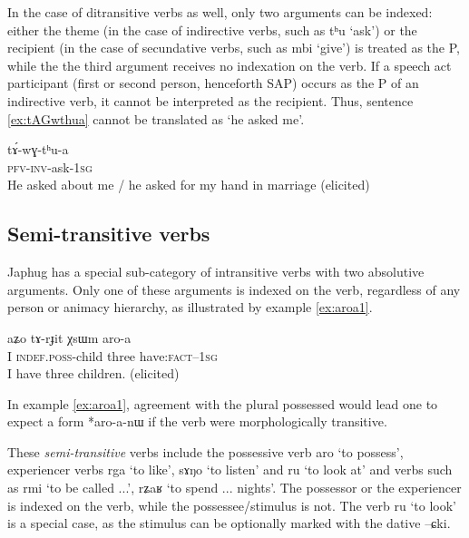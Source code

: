 \documentclass[oldfontcommands,oneside,a4paper,11pt]{article}
\newcommand{\ipa}[1]{{\phon #1}} %
\begin{document}
In the case of ditransitive verbs as well, only two arguments can be indexed: either the theme (in the case of indirective verbs, such as \ipa{tʰu} `ask') or the recipient (in the case of secundative verbs, such as \ipa{mbi} `give') is treated as the P, while the the third argument receives no indexation on the verb. If a  speech act participant (first or second person, henceforth SAP) occurs as the P of an indirective verb, it cannot be interpreted as the recipient. Thus, sentence \ref{ex:tAGwthua} cannot be translated as `he asked me'.

 \begin{exe}
   \ex   \label{ex:tAGwthua}
 \gll
\ipa{tɤ́-wɣ-tʰu-a} \\
\textsc{pfv-inv}-ask-\textsc{1sg}\\
\glt He asked about me / he asked for my hand in marriage (elicited)   
      \end{exe}  
      

\subsection{Semi-transitive verbs}
  Japhug has a special sub-category of intransitive verbs with two absolutive arguments. Only one of these arguments is indexed on the verb, regardless of any person or animacy hierarchy, as illustrated by example \ref{ex:aroa1}.
  

 \begin{exe}
   \ex   \label{ex:aroa1}
 \gll 
\ipa{aʑo}  	\ipa{tɤ-rɟit}  	\ipa{χsɯm}  	\ipa{aro-a}   \\
I \textsc{indef.poss}-child three have:\textsc{fact}--\textsc{1sg} \\
 \glt   I have three children. (elicited)
   \end{exe} 

 
In example \ref{ex:aroa1}, agreement with the plural possessed would lead one to expect a form *\ipa{aro-a-nɯ} if the verb were morphologically transitive.
  

  These  \textit{semi-transitive} verbs   include the possessive verb \ipa{aro} `to possess',  experiencer verbs \ipa{rga} `to like', \ipa{sɤŋo} `to listen' and \ipa{ru} `to look at' and verbs such as \ipa{rmi} `to be called ...', \ipa{rʑaʁ} `to spend ... nights'. The possessor or the experiencer is indexed on the verb, while the possessee/stimulus is not. The verb \ipa{ru} `to look' is a special case, as the stimulus can be optionally marked with the dative \ipa{--ɕki}. 
\end{document}
